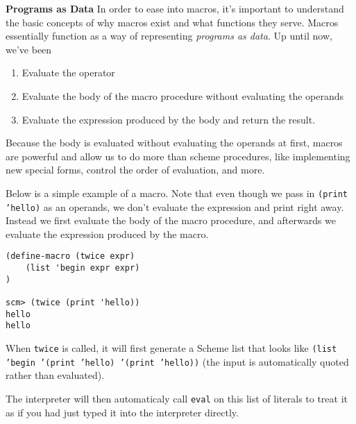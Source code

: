 \textbf{Programs as Data} 
In order to ease into macros, it's important to understand the basic concepts of why macros exist and what functions they serve.
Macros essentially function as a way of representing \textit{programs as data}.
Up until now, we've been 


\begin{enumerate}[1.]
\item Evaluate the operator
\item Evaluate the body of the macro procedure without evaluating the operands
\item Evaluate the expression produced by the body and return the result.
\end{enumerate}

Because the body is evaluated without evaluating the operands at first, macros are powerful and allow us to do more than scheme procedures, like implementing new special forms, control the order of evaluation, and more. 

Below is a simple example of a macro. Note that even though we pass in \texttt{(print 'hello)} as an operands, we don't evaluate the expression and print right away. Instead we first evaluate the body of the macro procedure, and afterwards we evaluate the expression produced by the macro. 
\vspace{1cm}
\begin{lstlisting}
(define-macro (twice expr)
    (list 'begin expr expr)
)

scm> (twice (print 'hello))
hello
hello
\end{lstlisting}

When \texttt{twice} is called, it will first generate a Scheme list that looks like \texttt{(list 'begin '(print 'hello) '(print 'hello))} (the input is automatically quoted rather than evaluated).

The interpreter will then automaticaly call \texttt{eval} on this list of literals to treat it as if you had just typed it into the interpreter directly. 